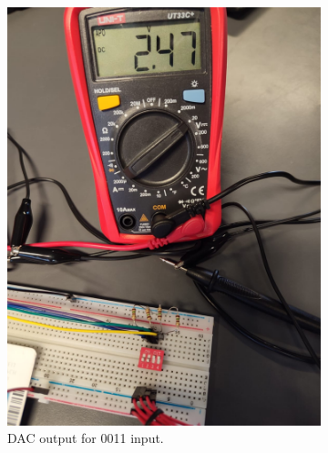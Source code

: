 \begin{figure}[H]
\begin{subfigure}[]{0.3\textwidth}
\includegraphics[width=\linewidth]{./Figures/DAC_Prac_0011.jpeg}
\caption{DAC output for 0011 input.} 			
\label{subfig:dac_prac_0011}	
\end{subfigure}
\vfill
\begin{subfigure}[]{0.3\textwidth}

\end{subfigure}
\end{figure}
